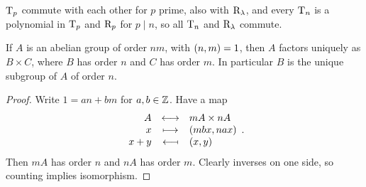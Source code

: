 
\begin{corollary}
$ \mathrm{T}_p $ commute with each other for $ p $ prime, also with $ \mathrm{R}_\lambda $, and every $ \mathrm{T}_n $ is a polynomial in $ \mathrm{T}_p $ and $ \mathrm{R}_p $ for $ p \mid n $, so all $ \mathrm{T}_n $ and $ \mathrm{R}_\lambda $ commute.
\end{corollary}

\begin{proposition}
If $ A $ is an abelian group of order $ nm $, with $ \br{n, m} = 1 $, then $ A $ factors uniquely as $ B \times C $, where $ B $ has order $ n $ and $ C $ has order $ m $. In particular $ B $ is the unique subgroup of $ A $ of order $ n $.
\end{proposition}

\begin{proof}
Write $ 1 = an + bm $ for $ a, b \in \mathbb{Z} $. Have a map
$$ \bijection{A}{mA \times nA}{x}{\br{mbx, nax}}{x + y}{\br{x, y}}. $$
Then $ mA $ has order $ n $ and $ nA $ has order $ m $. Clearly inverses on one side, so counting implies isomorphism.
\end{proof}

